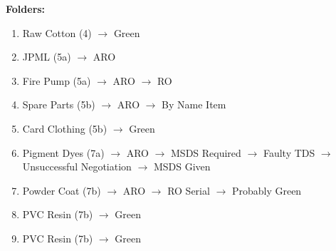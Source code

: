\documentclass[12pt]{article}
\begin{document}
\noindent
\textbf{Folders:}
\begin{enumerate}
\item
    Raw Cotton (4)
$\rightarrow$
Green

\item
    JPML (5a)
$\rightarrow$
ARO

\item
    Fire Pump (5a)
$\rightarrow$
ARO
$\rightarrow$
RO

\item
    Spare Parts (5b)
$\rightarrow$
ARO
$\rightarrow$
By Name Item

\item
    Card Clothing (5b)
$\rightarrow$
Green

\item
    Pigment Dyes (7a)
$\rightarrow$
ARO
$\rightarrow$
MSDS Required
$\rightarrow$
Faulty TDS
$\rightarrow$
Unsuccessful Negotiation
$\rightarrow$
MSDS Given


\item
    Powder Coat (7b)
$\rightarrow$
ARO
$\rightarrow$
RO Serial
$\rightarrow$
Probably Green

\item
    PVC Resin (7b)
$\rightarrow$
Green

\item
PVC Resin (7b)
$\rightarrow$
Green



\end{enumerate}
\end{document}
